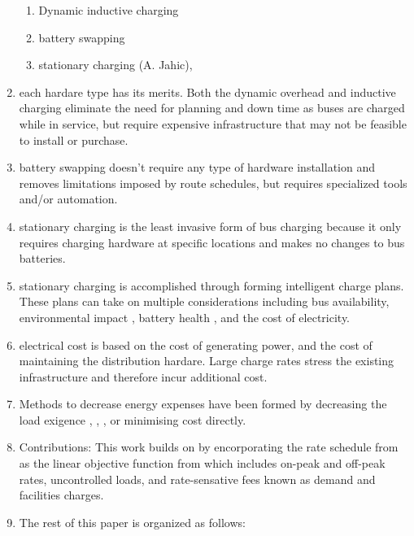 \begin{enumerate}
\begin{enumerate}
			\item Dynamic inductive charging \cite{jeong_automatic_2018} \cite{balde_electric_2019}
			\item battery swapping \cite{jain_battery_2020} \cite{xian_zhang_optimal_2016}
			\item stationary charging (A. Jahic),\cite{whitaker_network_nodate}
		\end{enumerate}
	\item each hardare type has its merits. Both the dynamic overhead and inductive charging eliminate the need for planning and down time as buses are charged while in service, but require expensive infrastructure that may not be feasible to install or purchase.
	\item battery swapping doesn't require any type of hardware installation and removes limitations imposed by route schedules, but requires specialized tools and/or automation.
	\item stationary charging is the least invasive form of bus charging because it only requires charging hardware at specific locations and makes no changes to bus batteries. 
	\item stationary charging is accomplished through forming intelligent charge plans. These plans can take on multiple considerations including bus availability, environmental impact \cite{zhou_bi-objective_2021}, battery health \cite{houbbadi_optimal_2019}, and the cost of electricity.
	\item electrical cost is based on the cost of generating power, and the cost of maintaining the distribution hardare. Large charge rates stress the existing infrastructure and therefore incur additional cost.
	\item Methods to decrease energy expenses have been formed by decreasing the load exigence \cite{cheng_smart_2020}, \cite{ojer_development_2020}, \cite{qin_numerical_2016}, \cite{bagherinezhad_spatio-temporal_2020} or minimising cost directly.
	\item Contributions: This work builds on \cite{brown_position_nodate} by encorporating the rate schedule from \cite{rocky_mountain_power_rocky_2021} as the linear objective function from \cite{mortensen_comprehensive_2020} which includes on-peak and off-peak rates, uncontrolled loads, and rate-sensative fees known as demand and facilities charges.  
	\item The rest of this paper is organized as follows: 
\end{enumerate}
